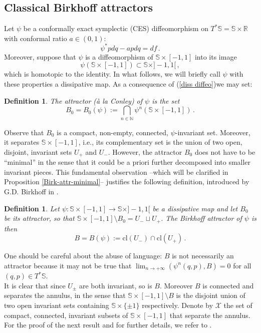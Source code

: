 \documentclass{article}
\newcommand{\1}{\mathbbm{1}}
\newcommand{\sphere}{\mathbb{S}}
\newtheorem{defn}[thm]{Definition}
\theoremstyle{remark}
\begin{document}
{{\subsection{Classical Birkhoff attractors}
Let $\psi$ be a conformally exact symplectic (CES) diffeomorphism on $T^*\mathbb{S} = \mathbb{S} \times \mathbb{R}$ with conformal ratio $a \in (0,1)$:
$$\psi^*pdq - a pdq = df\, .$$
Moreover, suppose that $\psi$ is a diffeomorphism of $\mathbb{S} \times [-1,1]$ into its image
\begin{equation} \label{diss diffeo}
\psi(\mathbb{S} \times [-1,1]) \subset \mathbb{S} \times ]-1,1[\, ,
\end{equation}
which is homotopic to the identity. In what follows, we will briefly call $\psi$ with these properties a dissipative map. As a consequence of (\ref{diss diffeo})we may set: 
\begin{defn} \label{Conley}
The attractor (\`a la Conley) of $\psi$ is the set
\[
B_0 = B_0(\psi):= \bigcap_{n\in\mathbb{N}}\psi^n(\mathbb{S} \times [-1,1])\, .
\]
\end{defn} 
\noindent Observe that $B_0$ is a compact, non-empty, connected, $\psi$-invariant set. Moreover, it separates  $\mathbb{S} \times [-1,1]$, i.e., its complementary set is the union of two open, disjoint, invariant sets $U_+$ and $U_-$. However, the attractor $B_0$ does not have to be ``minimal'' in the sense that it could be a priori further decomposed into smaller invariant pieces. This fundamental observation --which will be clarified in Proposition \ref{Birk-attr-minimal}--  justifies the following definition, introduced by G.D. Birkhoff in \cite{bir32}.
\begin{defn}
 Let $\psi: \mathbb{S} \times [-1 , 1] \to \mathbb{S} \times ]-1,1[$ be a dissipative map and let $B_0$ be its attractor, so that $\mathbb{S} \times [-1,1] \setminus B_0 = U_-\sqcup U_+$. The Birkhoff attractor of $\psi$ is then
 \[
 B = B(\psi):= \mathrm{cl}(U_-)\cap \mathrm{cl}(U_+)\, .
 \]
\end{defn}
One should be careful about the abuse of language: $B$ is not necessarily an attractor because it may not be true that $\lim_{n \to +\infty}(\psi^n(q,p),B)=0$ for all $(q,p) \in T^*\mathbb S$. \\
\noindent It is clear that since $U_\pm$ are both invariant, so is $B$. Moreover $B$ is connected and separates the annulus, in the sense that $\mathbb{S} \times [-1 , 1] \setminus B$ is the disjoint union of two open invariant sets containing $\sphere\times \{\pm 1\}$ respectively. Denote by $\mathcal{X}$ the set of compact, connected, invariant subsets of $\mathbb{S} \times [-1 , 1]$ that separate the annulus. For the proof of the next result and for further details, we refer to \cite{lec88}.
}}
\end{document}
